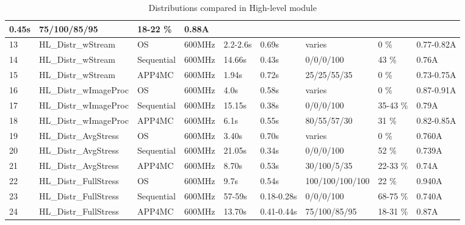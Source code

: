 {\begin{table}[!ht]
{\begin{tabular}{|l|l|l|l|l|l|l|l|l|}
				0.45s &
				75/100/85/95 &
				18-22 \% &
				0.88A \\
				\hline
				13 &
				HL{\_}Distr{\_}wStream &
				OS &
				600MHz &
				2.2-2.6s &
				0.69s &
				varies &
				0 \% &
				0.77-0.82A \\
				\hline
				14 &
				HL{\_}Distr{\_}wStream &
				Sequential &
				600MHz &
				14.66s &
				0.43s &
				0/0/0/100 &
				43 \% &
				0.76A \\
				\hline
				15 &
				HL{\_}Distr{\_}wStream &
				APP4MC &
				600MHz &
				1.94s &
				0.72s &
				25/25/55/35 &
				0 \% &
				0.73-0.75A \\
				\hline
				16 &
				HL{\_}Distr{\_}wImageProc &
				OS &
				600MHz &
				4.0s &
				0.58s &
				varies&
				0 \% &
				0.87-0.91A \\
				\hline
				17 &
				HL{\_}Distr{\_}wImageProc &
				Sequential &
				600MHz &
				15.15s &
				0.38s &
				0/0/0/100 &
				35-43 \% &
				0.79A \\
				\hline
				18 &
				HL{\_}Distr{\_}wImageProc &
				APP4MC &
				600MHz &
				6.1s &
				0.55s &
				80/55/57/30 &
				31 \% &
				0.82-0.85A \\
				\hline
				19 &
				HL{\_}Distr{\_}AvgStress &
				OS &
				600MHz &
				3.40s &
				0.70s &
				varies  &
				0 \% &
				0.760A \\
				\hline
				20 &
				HL{\_}Distr{\_}AvgStress &
				Sequential &
				600MHz &
				21.05s &
				0.34s &
				0/0/0/100 &
				52 \% &
				0.739A \\
				\hline
				21 &
				HL{\_}Distr{\_}AvgStress &
				APP4MC &
				600MHz &
				8.70s &
				0.53s &
				30/100/5/35 &
				22-33 \% &
				0.74A \\
				\hline
				22 &
				HL{\_}Distr{\_}FullStress &
				OS &
				600MHz &
				9.7s &
				0.54s &
				100/100/100/100 &
				22 \% &
				0.940A \\
				\hline
				23 &
				HL{\_}Distr{\_}FullStress &
				Sequential &
				600MHz &
				57-59s &
				0.18-0.28s &
				0/0/0/100 &
				68-75 \% &
				0.740A \\
				\hline
				24 &
				HL{\_}Distr{\_}FullStress &
				APP4MC &
				600MHz &
				13.70s &
				0.41-0.44s &
				75/100/85/95 &
				18-31 \% &
				0.87A \\
				\hline
			\end{tabular}
			}
			\caption{Distributions compared in High-level module}
			\label{tbl_hlcomparison}
		\end{table}
}

